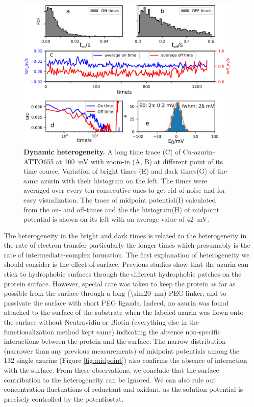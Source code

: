 \documentclass[journal=jacsat,manuscript=article]{achemso}
\begin{document}
\begin{figure}
	\centering
	\includegraphics[width=\textwidth]{long_azurin_trace}
	\caption{\textbf{Dynamic heterogeneity.} A long time trace (C) of Cu-azurin-ATTO655 at \SI{100}{\mV} with zoom-in (A, B) at different point of its time course.
	Variation of bright times (E) and dark times(G) of the same azurin with their histogram on the left.
	The times were averaged over every ten consecutive ones to get rid of noise and for easy visualization.
	The trace of midpoint potential(I) calculated from the on- and off-times and the the histogram(H) of midpoint potential is shown on its left with an average value of \SI{42}{\mV}.
	}
	\label{fig:long_azurin_trace}
\end{figure}

The heterogeneity in the bright and dark times is related to the heterogeneity in the rate of electron transfer particularly the longer times which presumably is the rate of intermediate-complex formation.
The first explanation of heterogeneity we should consider is the effect of surface.
Previous studies show that the azurin can stick to hydrophobic surfaces through the different hydrophobic patches on the protein surface.\cite{patil2010visualizing,salverda2010fluorescent,akkilic2014chemically-induced}
However, special care was taken to keep the protein as far as possible from the surface through a long (\SI{\sim20}{\nm}) PEG-linker, and to passivate the surface with short PEG ligands.
Indeed, no azurin was found attached to the surface of the substrate when the labeled azurin was flown onto the surface without Neutravidin or Biotin (everything else in the functionalization method kept same) indicating the absence non-specific interactions between the protein and the surface.
The narrow distribution (narrower than any previous measurements) of midpoint potentials among the 132 single azurins (Figure \ref{fig:midpoint}) also confirms the absence of interaction with the surface.
From these observations, we conclude that the surface contribution to the heterogeneity can be ignored.
We can also rule out concentration fluctuations of reductant and oxidant, as the solution potential is precisely controlled by the potentiostat.
\end{document}

